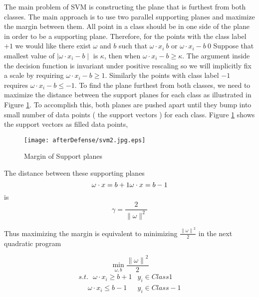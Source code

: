 The main problem of SVM is constructing the plane that is furthest from both classes. The main approach is to use two parallel supporting planes and maximize the margin between them. All point in a class should be in one side of the plane in order to be a supporting plane.  Therefore, for the points with the class label $+1$ we would like there exist $\omega$ and $b$ such that $\omega \cdot x_i\> b$ or $\omega \cdot x_i -b \> 0$%
Suppose that smallest value of $\mid \omega \cdot x_i -b\mid$ is $\kappa$, then when $ \omega \cdot x_i -b \geq \kappa$. The argument inside the decision function is invariant under positive rescaling so we will implicitly fix a scale by requiring $\omega \cdot x_i -b \geq 1 $. Similarly the points with class label $-1$ requires $\omega \cdot x_i -b \leq -1 $. To find the plane furthest from both classes, we need to maximize the distance between the support planes for each class as illustrated in Figure \ref{fig:svm2}. To accomplish this, both planes are pushed apart until they bump into small number of data points ( the support vectors ) for each class. Figure \ref{fig:svm2} shows the support vectors as filled data points, 
\begin{figure}
	\centering
		\texttt{[image: afterDefense/svm2.jpg.eps]}
	\caption{Margin of Support planes }
	\label{fig:svm2}
\end{figure}


The distance between these supporting planes 
\begin{equation}
 \omega \cdot x=b+1 \\
  \omega \cdot x=b-1
\end{equation}
is 
\begin{equation}
 \gamma = \frac{2}{\parallel \omega \parallel^2}
\end{equation}

Thus maximizing the margin is equivalent to minimizing $\frac{{\parallel \omega \parallel}^2}{2}$ in the next quadratic program 

\begin{equation}
 \min_{\omega,b}  \frac{{\parallel \omega \parallel}^2}{2}
\end{equation}
\begin{equation}	
\begin{array}{cc}
 s.t. \ \ \   \omega \cdot x_i \geq b+1 &    y_i \in Class 1 \\ 
 \ \ \ \ \ \   \omega \cdot x_i \leq b-1 &    y_i \in Class -1 
  \end{array} 
\end{equation}

